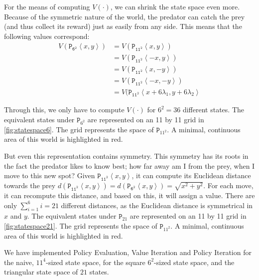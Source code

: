 \documentclass[a4paper,11pt]{article}
\newcommand{\p}[2]{\ensuremath{\mathtt{P_{11^2}}\left<#1, #2\right>}}
\newcommand{\pSW}[2]{\ensuremath{\mathtt{P_{6^2}}\left<#1, #2\right>}}
\begin{document}
For the means of computing $V(\cdot)$, we can shrink the state space even more.  Because of the symmetric nature of the world, the predator can catch the prey (and thus collect its reward) just as easily from any side.  This means that the following values correspond:
\begin{align*}
V(\pSW{x}{y})
  &= V(\p{x}{y}) \\
  &= V(\p{-x}{y}) \\
  &= V(\p{x}{-y}) \\
  &= V(\p{-x}{-y}) \\
  &= V(\p{x + 6 \lambda_1}{y + 6 \lambda_2}
\end{align*}

Through this, we only have to compute $V(\cdot)$ for $6^2 = 36$ different states.  The equivalent states under $\mathtt{P}_{6^2}$ are represented on an 11 by 11 grid in \autoref{fig:statespace6}.  The grid represents the space of $\mathtt{P}_{11^2}$.  A minimal, continuous area of this world is highlighted in red.

But even this representation contains symmetry.  This symmetry has its roots in the fact the predator likes to know best; how far away am I from the prey, when I move to this new spot?  Given $\p{x}{y}$, it can compute its Euclidean distance towards the prey $d(\p{x}{y}) = d(\pSW{x}{y}) = \sqrt{x^2+y^2}$.  For each move, it can recompute this distance, and based on this, it will assign a value.  There are only $\sum_{i=1}^{6} i = 21$ different distances, as the Euclidean distance is symmetrical in $x$ and $y$.  The equivalent states under $\mathtt{P}_{21}$ are represented on an 11 by 11 grid in \autoref{fig:statespace21}.  The grid represents the space of $\mathtt{P}_{11^2}$.  A minimal, continuous area of this world is highlighted in red.

We have implemented Policy Evaluation, Value Iteration and Policy Iteration for the naive, $11^4$-sized state space, for the square $6^2$-sized state space, and the triangular state space of $21$ states.
\end{document}
